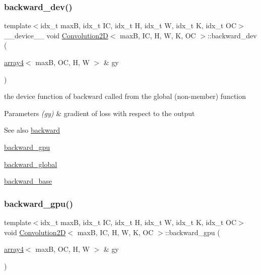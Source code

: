 \subsubsection{\texorpdfstring{backward\+\_\+dev()}{backward\_dev()}}
{\footnotesize\ttfamily template$<$idx\+\_\+t maxB, idx\+\_\+t IC, idx\+\_\+t H, idx\+\_\+t W, idx\+\_\+t K, idx\+\_\+t OC$>$ \\
\+\_\+\+\_\+device\+\_\+\+\_\+ void \hyperlink{structConvolution2D}{Convolution2D}$<$ maxB, IC, H, W, K, OC $>$\+::backward\+\_\+dev (\begin{DoxyParamCaption}\item[{\hyperlink{structarray4}{array4}$<$ maxB, OC, H, W $>$ \&}]{gy }\end{DoxyParamCaption})\hspace{0.3cm}{\ttfamily [inline]}}



the device function of backward called from the global (non-\/member) function 


\begin{DoxyParams}{Parameters}
{\em (gy)} & gradient of loss with respect to the output \\
\hline
\end{DoxyParams}
\begin{DoxySeeAlso}{See also}
\hyperlink{structConvolution2D_ace928f0589a42b6505f5787652ffbacd}{backward} 

\hyperlink{structConvolution2D_af7105f910c11a7bd93e27a7abc06e502}{backward\+\_\+gpu} 

\hyperlink{softmaxcrossentropy_8h_a47d56a9a23e08247b227f4aac17413e0}{backward\+\_\+global} 

\hyperlink{structConvolution2D_af202e85ae6c5aa5e4aae6869a8891fc3}{backward\+\_\+base} 
\end{DoxySeeAlso}
\mbox{\label{structConvolution2D_af7105f910c11a7bd93e27a7abc06e502}} 
\subsubsection{\texorpdfstring{backward\+\_\+gpu()}{backward\_gpu()}}
{\footnotesize\ttfamily template$<$idx\+\_\+t maxB, idx\+\_\+t IC, idx\+\_\+t H, idx\+\_\+t W, idx\+\_\+t K, idx\+\_\+t OC$>$ \\
void \hyperlink{structConvolution2D}{Convolution2D}$<$ maxB, IC, H, W, K, OC $>$\+::backward\+\_\+gpu (\begin{DoxyParamCaption}\item[{\hyperlink{structarray4}{array4}$<$ maxB, OC, H, W $>$ \&}]{gy }\end{DoxyParamCaption})\hspace{0.3cm}{\ttfamily [inline]}}



